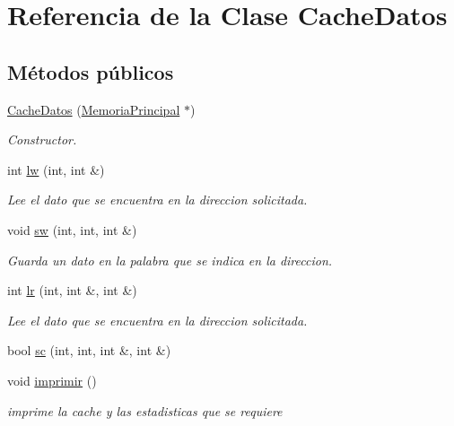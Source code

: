 \hypertarget{classCacheDatos}{}\section{Referencia de la Clase Cache\+Datos}
\label{classCacheDatos}
\subsection*{Métodos públicos}
\begin{DoxyCompactItemize}
\item 
\hyperlink{classCacheDatos_ab07b4bbe9bcc0cf9597d830ac6ff1eef}{Cache\+Datos} (\hyperlink{classMemoriaPrincipal}{Memoria\+Principal} $\ast$)
\begin{DoxyCompactList}\small\item\em Constructor. \end{DoxyCompactList}\item 
int \hyperlink{classCacheDatos_abe68f33f8549a4d0467c6c0b2eb6c463}{lw} (int, int \&)
\begin{DoxyCompactList}\small\item\em Lee el dato que se encuentra en la direccion solicitada. \end{DoxyCompactList}\item 
void \hyperlink{classCacheDatos_adcc01761d92c14b36a164f4367898277}{sw} (int, int, int \&)
\begin{DoxyCompactList}\small\item\em Guarda un dato en la palabra que se indica en la direccion. \end{DoxyCompactList}\item 
int \hyperlink{classCacheDatos_a358cf45084deeeca1bf689a22b28cb27}{lr} (int, int \&, int \&)
\begin{DoxyCompactList}\small\item\em Lee el dato que se encuentra en la direccion solicitada. \end{DoxyCompactList}\item 
bool \hyperlink{classCacheDatos_a3f45fa41418612c913095caa7f2ba9a4}{sc} (int, int, int \&, int \&)
\item 
\mbox{\label{classCacheDatos_ae38afe483dfc35d8159b828d4785333f}} 
void \hyperlink{classCacheDatos_ae38afe483dfc35d8159b828d4785333f}{imprimir} ()
\begin{DoxyCompactList}\small\item\em imprime la cache y las estadisticas que se requiere \end{DoxyCompactList}\end{DoxyCompactItemize}


